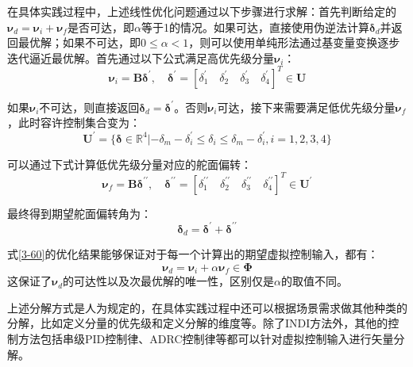 在具体实践过程中，上述线性优化问题通过以下步骤进行求解：首先判断给定的$\boldsymbol{\nu}_d=\boldsymbol{\nu}_i+\boldsymbol{\nu}_f$是否可达，即$\alpha$等于1的情况。如果可达，直接使用伪逆法计算$\boldsymbol{\delta}_d$并返回最优解；如果不可达，即$0\leqslant\alpha<1$，则可以使用单纯形法通过基变量变换逐步迭代逼近最优解。首先通过以下公式满足高优先级分量$\boldsymbol{\nu}_i$：
\begin{equation}
    \boldsymbol{\nu}_i=\boldsymbol{B}\boldsymbol{\delta}^\prime,\quad\boldsymbol{\delta}^\prime=[\delta_{1}^\prime\quad\delta_{2}^\prime\quad\delta_{3}^\prime\quad\delta_{4}^\prime]^T\in\boldsymbol{U}
    \label{3-61}
\end{equation}

如果$\boldsymbol{\nu}_i$不可达，则直接返回$\boldsymbol{\delta}_d=\boldsymbol{\delta}^\prime$。否则$\boldsymbol{\nu}_i$可达，接下来需要满足低优先级分量$\boldsymbol{\nu}_f$，此时容许控制集合变为：
\begin{equation}
    \boldsymbol{U}^\prime=\{\boldsymbol{\delta}\in\mathbb{R}^4|-\delta_m-\delta_{i}^\prime\leq\delta_i\leq\delta_m-\delta_{i}^\prime,i=1,2,3,4\}
    \label{3-62}
\end{equation}

可以通过下式计算低优先级分量对应的舵面偏转：
\begin{equation}
    \boldsymbol{\nu}_f=\boldsymbol{B}\boldsymbol{\delta}^{\prime\prime},\quad\boldsymbol{\delta}^{\prime\prime}=[\delta_{1}^{\prime\prime}\quad\delta_{2}^{\prime\prime}\quad\delta_{3}^{\prime\prime}\quad\delta_{4}^{\prime\prime}]^T\in\boldsymbol{U}^{\prime}
    \label{3-63}
\end{equation}

最终得到期望舵面偏转角为：
\begin{equation}
    \boldsymbol{\delta}_d = \boldsymbol{\delta}^{\prime}+\boldsymbol{\delta}^{\prime\prime}
    \label{3-64}
\end{equation}

式\eqref{3-60}的优化结果能够保证对于每一个计算出的期望虚拟控制输入，都有：
\begin{equation}
    \boldsymbol{\nu}_d=\boldsymbol{\nu}_i+\alpha\boldsymbol{\nu}_f\in \boldsymbol{\Phi}
\label{3-65}
\end{equation}
这保证了$\boldsymbol{\nu}_d$的可达性以及次最优解的唯一性，区别仅是$\alpha$的取值不同。

上述分解方式是人为规定的，在具体实践过程中还可以根据场景需求做其他种类的分解，比如定义分量的优先级和定义分解的维度等。除了INDI方法外，其他的控制方法包括串级PID控制律、ADRC控制律\cite{HKXB202010026}等都可以针对虚拟控制输入进行矢量分解。

